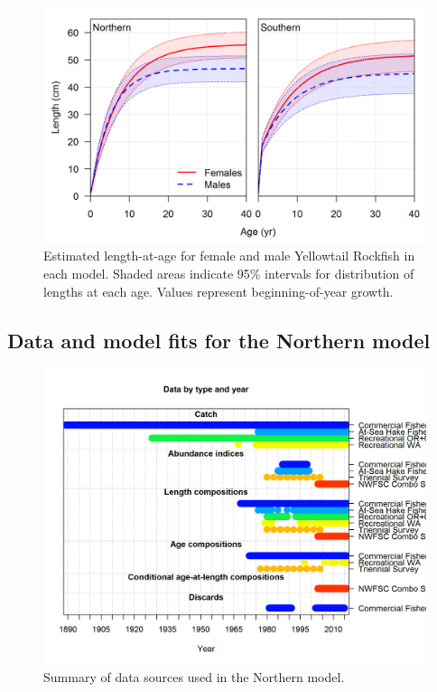 \documentclass[12pt,]{article}
\begin{document}
\begin{figure}[htbp]
\centering
\includegraphics{r4ss/plots_compare/growth_comparison.png}
\caption{Estimated length-at-age for female and male Yellowtail Rockfish
in each model. Shaded areas indicate 95\% intervals for distribution of
lengths at each age. Values represent beginning-of-year growth.
\label{fig:growth}}
\end{figure}

\FloatBarrier 

\newpage

\subsection{Data and model fits for the Northern
model}\label{data-and-model-fits-for-the-northern-model}

\begin{figure}[htbp]
\centering
\includegraphics{r4ss/plots_mod1/data_plot.png}
\caption{Summary of data sources used in the Northern model.
\label{fig:data_plot.N}}
\end{figure}
\end{document}
